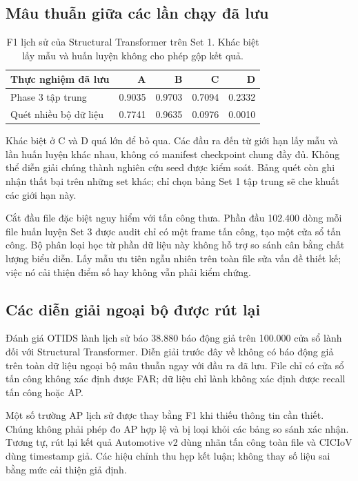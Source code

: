 \documentclass[12pt,a4paper,oneside,openany]{extbook}
\begin{document}
\subsection{Mâu thuẫn giữa các lần chạy đã lưu}

\begin{table}[htbp]\centering
\caption{F1 lịch sử của Structural Transformer trên Set 1. Khác biệt lấy mẫu và huấn luyện không cho phép gộp kết quả.}\label{tab:disagreement}
\begin{tabular}{lrrrr}\toprule
Thực nghiệm đã lưu & A & B & C & D\\\midrule
Phase 3 tập trung & 0.9035 & 0.9703 & 0.7094 & 0.2332\\
Quét nhiều bộ dữ liệu & 0.7741 & 0.9635 & 0.0976 & 0.0010\\\bottomrule
\end{tabular}
\end{table}

Khác biệt ở C và D quá lớn để bỏ qua. Các đầu ra đến từ giới hạn lấy mẫu và lần huấn luyện khác nhau, không có manifest checkpoint chung đầy đủ. Không thể diễn giải chúng thành nghiên cứu seed được kiểm soát. Bảng quét còn ghi nhận thất bại trên những set khác; chỉ chọn bảng Set 1 tập trung sẽ che khuất các giới hạn này.

Cắt đầu file đặc biệt nguy hiểm với tấn công thưa. Phần đầu 102.400 dòng mỗi file huấn luyện Set 3 được audit chỉ có một frame tấn công, tạo một cửa sổ tấn công. Bộ phân loại học từ phần dữ liệu này không hỗ trợ so sánh cân bằng chất lượng biểu diễn. Lấy mẫu ưu tiên ngẫu nhiên trên toàn file sửa vấn đề thiết kế; việc nó cải thiện điểm số hay không vẫn phải kiểm chứng.

\subsection{Các diễn giải ngoại bộ được rút lại}
Đánh giá OTIDS lành lịch sử báo 38.880 báo động giả trên 100.000 cửa sổ lành đối với Structural Transformer. Diễn giải trước đây về không có báo động giả trên toàn dữ liệu ngoại bộ mâu thuẫn ngay với đầu ra đã lưu. File chỉ có cửa sổ tấn công không xác định được FAR; dữ liệu chỉ lành không xác định được recall tấn công hoặc AP.

Một số trường AP lịch sử được thay bằng F1 khi thiếu thông tin cần thiết. Chúng không phải phép đo AP hợp lệ và bị loại khỏi các bảng so sánh xác nhận. Tương tự, rút lại kết quả Automotive v2 dùng nhãn tấn công toàn file và CICIoV dùng timestamp giả. Các hiệu chỉnh thu hẹp kết luận; không thay số liệu sai bằng mức cải thiện giả định.
\end{document}
